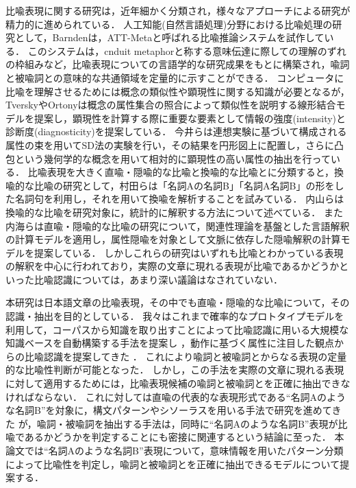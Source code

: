 比喩表現に関する研究は，近年細かく分類され，様々なアプローチによる研究が精力的に進められている．
人工知能(自然言語処理)分野における比喩処理の研究として，Barndenは，ATT-Metaと呼ばれる比喩推論システムを試作している\cite{Barnden-1}．
このシステムは，cnduit metaphorと称する意味伝達に際しての理解のずれの枠組み\cite{Reddy-1}など，比喩表現についての言語学的な研究成果をもとに構築され，喩詞と被喩詞との意味的な共通領域を定量的に示すことができる．
コンピュータに比喩を理解させるためには概念の類似性や顕現性に関する知識が必要となるが，
TverskyやOrtonyは概念の属性集合の照合によって類似性を説明する線形結合モデルを提案し，顕現性を計算する際に重要な要素として情報の強度(intensity)と診断度(diagnosticity)を提案している\cite{Tversky-1,Ortony-3}．
今井らは連想実験に基づいて構成される属性の束を用いてSD法の実験を行い，その結果を円形図上に配置し，さらに凸包という幾何学的な概念を用いて相対的に顕現性の高い属性の抽出を行っている\cite{Imai-1}．
比喩表現を大きく直喩・隠喩的な比喩と換喩的な比喩とに分類すると，換喩的な比喩の研究として，村田らは「名詞Aの名詞B」「名詞A名詞B」の形をした名詞句を利用し，それを用いて換喩を解析することを試みている\cite{Murata-1}．
内山らは換喩的な比喩を研究対象に，統計的に解釈する方法について述べている\cite{Uchiyama-1}．
また内海らは直喩・隠喩的な比喩の研究について，関連性理論を基盤とした言語解釈の計算モデルを適用し，属性隠喩を対象として文脈に依存した隠喩解釈の計算モデルを提案している\cite{Utsumi-1}．
しかしこれらの研究はいずれも比喩とわかっている表現の解釈を中心に行われており，実際の文章に現れる表現が比喩であるかどうかといった比喩認識については，あまり深い議論はなされていない．

本研究は日本語文章の比喩表現，その中でも直喩・隠喩的な比喩について，その認識・抽出を目的としている．
我々はこれまで確率的なプロトタイプモデル\cite{Iwayama-1}を利用して，コーパスから知識を取り出すことによって比喩認識に用いる大規模な知識ベースを自動構築する手法を提案し
\cite{Masui-1}
，動作に基づく属性に注目した観点からの比喩認識を提案してきた
\cite{Masui-3}
．
これにより喩詞と被喩詞とからなる表現の定量的な比喩性判断が可能となった．
しかし，この手法を実際の文章に現れる表現に対して適用するためには，比喩表現候補の喩詞と被喩詞とを正確に抽出できなければならない．
これに対しては直喩の代表的な表現形式である``名詞Aのような名詞B''を対象に，構文パターンやシソーラスを用いる手法で研究を進めてきた
\cite{Tazoe-1,Tazoe-2}
が，喩詞・被喩詞を抽出する手法は，同時に``名詞Aのような名詞B''表現が比喩であるかどうかを判定することにも密接に関連するという結論に至った．
本論文では``名詞Aのような名詞B''表現について，意味情報を用いたパターン分類によって比喩性を判定し，喩詞と被喩詞とを正確に抽出できるモデルについて提案する．

